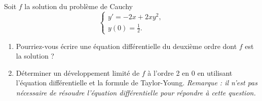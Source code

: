 
\begin{exercice}\label{exosession1-0007}

Soit $f$ la solution du problème de Cauchy 
\begin{equation*}
  \begin{cases}
    y'=-2x+2xy^2, \\
    y(0)= \frac{1}{2}.
  \end{cases}
\end{equation*}
\begin{enumerate}
\item Pourriez-vous écrire une équation différentielle du deuxième ordre dont $f$ est la solution ? 
\item Déterminer un développement limité de $f$ à l'ordre 2 en 0 en utilisant l'équation différentielle et la formule de Taylor-Young. \emph{Remarque : il n'est pas nécessaire de résoudre l'équation différentielle pour répondre à cette question.}
\end{enumerate}


\end{exercice}

